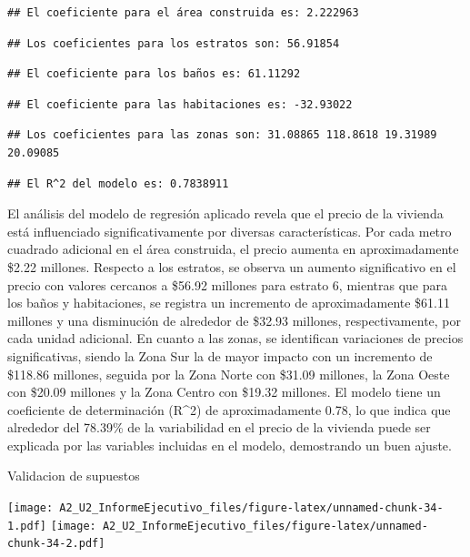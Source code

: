 \documentclass[
]{article}
\begin{document}
\begin{verbatim}
## El coeficiente para el área construida es: 2.222963
\end{verbatim}

\begin{verbatim}
## Los coeficientes para los estratos son: 56.91854
\end{verbatim}

\begin{verbatim}
## El coeficiente para los baños es: 61.11292
\end{verbatim}

\begin{verbatim}
## El coeficiente para las habitaciones es: -32.93022
\end{verbatim}

\begin{verbatim}
## Los coeficientes para las zonas son: 31.08865 118.8618 19.31989 20.09085
\end{verbatim}

\begin{verbatim}
## El R^2 del modelo es: 0.7838911
\end{verbatim}

El análisis del modelo de regresión aplicado revela que el precio de la
vivienda está influenciado significativamente por diversas
características. Por cada metro cuadrado adicional en el área
construida, el precio aumenta en aproximadamente \$2.22 millones.
Respecto a los estratos, se observa un aumento significativo en el
precio con valores cercanos a \$56.92 millones para estrato 6, mientras
que para los baños y habitaciones, se registra un incremento de
aproximadamente \$61.11 millones y una disminución de alrededor de
\$32.93 millones, respectivamente, por cada unidad adicional. En cuanto
a las zonas, se identifican variaciones de precios significativas,
siendo la Zona Sur la de mayor impacto con un incremento de \$118.86
millones, seguida por la Zona Norte con \$31.09 millones, la Zona Oeste
con \$20.09 millones y la Zona Centro con \$19.32 millones. El modelo
tiene un coeficiente de determinación (R\^{}2) de aproximadamente 0.78,
lo que indica que alrededor del 78.39\% de la variabilidad en el precio
de la vivienda puede ser explicada por las variables incluidas en el
modelo, demostrando un buen ajuste.

Validacion de supuestos

\texttt{[image: A2\_U2\_InformeEjecutivo\_files/figure-latex/unnamed-chunk-34-1.pdf]}
\texttt{[image: A2\_U2\_InformeEjecutivo\_files/figure-latex/unnamed-chunk-34-2.pdf]}
\end{document}

